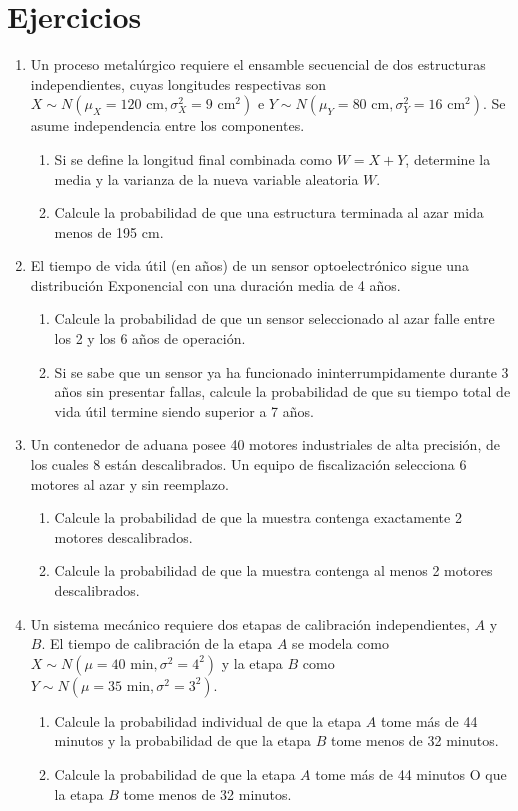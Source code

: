 \documentclass[letterpaper,12pt]{article}
\newenvironment{ejercicios}{%
    \section*{Ejercicios}
}{}
\begin{document}
\begin{ejercicios}
\begin{enumerate}[leftmargin=*,itemsep=0.8em]
    \item Un proceso metalúrgico requiere el ensamble secuencial de dos estructuras independientes, cuyas longitudes respectivas son $X \sim N(\mu_X = 120\text{ cm}, \sigma_X^2 = 9\text{ cm}^2)$ e $Y \sim N(\mu_Y = 80\text{ cm}, \sigma_Y^2 = 16\text{ cm}^2)$. Se asume independencia entre los componentes.
    \begin{enumerate}[label=\alph*)]
        \item Si se define la longitud final combinada como $W = X + Y$, determine la media y la varianza de la nueva variable aleatoria $W$.
        \item Calcule la probabilidad de que una estructura terminada al azar mida menos de 195 cm.
    \end{enumerate}

    \item El tiempo de vida útil (en años) de un sensor optoelectrónico sigue una distribución Exponencial con una duración media de 4 años.
    \begin{enumerate}[label=\alph*)]
        \item Calcule la probabilidad de que un sensor seleccionado al azar falle entre los 2 y los 6 años de operación.
        \item Si se sabe que un sensor ya ha funcionado ininterrumpidamente durante 3 años sin presentar fallas, calcule la probabilidad de que su tiempo total de vida útil termine siendo superior a 7 años.
    \end{enumerate}

    \item Un contenedor de aduana posee 40 motores industriales de alta precisión, de los cuales 8 están descalibrados. Un equipo de fiscalización selecciona 6 motores al azar y sin reemplazo.
    \begin{enumerate}[label=\alph*)]
        \item Calcule la probabilidad de que la muestra contenga exactamente 2 motores descalibrados.
        \item Calcule la probabilidad de que la muestra contenga al menos 2 motores descalibrados.
    \end{enumerate}

    \item Un sistema mecánico requiere dos etapas de calibración independientes, $A$ y $B$. El tiempo de calibración de la etapa $A$ se modela como $X \sim N(\mu=40\text{ min}, \sigma^2=4^2)$ y la etapa $B$ como $Y \sim N(\mu=35\text{ min}, \sigma^2=3^2)$.
    \begin{enumerate}[label=\alph*)]
        \item Calcule la probabilidad individual de que la etapa $A$ tome más de 44 minutos y la probabilidad de que la etapa $B$ tome menos de 32 minutos.
        \item Calcule la probabilidad de que la etapa $A$ tome más de 44 minutos O que la etapa $B$ tome menos de 32 minutos.
    \end{enumerate}


\end{enumerate}
\end{ejercicios}
\end{document}
